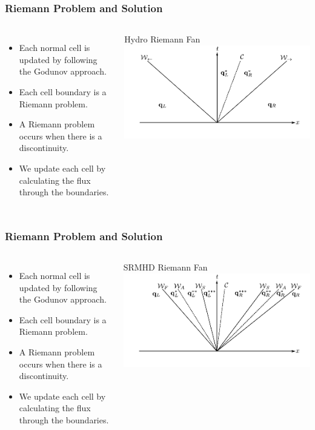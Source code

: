 \documentclass{beamer}
\begin{document}
\begin{frame}
\frametitle{Riemann Problem and Solution}
\begin{columns}
\begin{itemize}
\item{Each normal cell is updated by following the Godunov approach.}
\item{Each cell boundary is a Riemann problem.}
\item{A Riemann problem occurs when there is a discontinuity.}
\item{We update each cell by calculating the flux through the boundaries.}
\end{itemize}
\centering
Hydro Riemann Fan
\includegraphics[width=\textwidth]{../images/euler_wave.pdf}
\end{columns}
\end{frame}

\begin{frame}
\frametitle{Riemann Problem and Solution}
\begin{columns}
\begin{itemize}
\item{Each normal cell is updated by following the Godunov approach.}
\item{Each cell boundary is a Riemann problem.}
\item{A Riemann problem occurs when there is a discontinuity.}
\item{We update each cell by calculating the flux through the boundaries.}
\end{itemize}
\centering
SRMHD Riemann Fan
\includegraphics[width=\textwidth]{../images/srmhd_wave.pdf}
\end{columns}
\end{frame}
\end{document}
